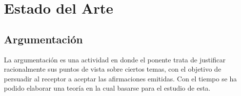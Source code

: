 \chapter{Estado del Arte}\label{chapter:state-of-the-art}




\section{Argumentación}

La argumentación es una actividad en donde el ponente trata de justificar racionalmente 
sus puntos de vista sobre ciertos temas, con el objetivo de persuadir al receptor a aceptar
las afirmaciones emitidas.  
Con el tiempo se ha podido elaborar una teoría en la cual basarse para el estudio de esta. 


